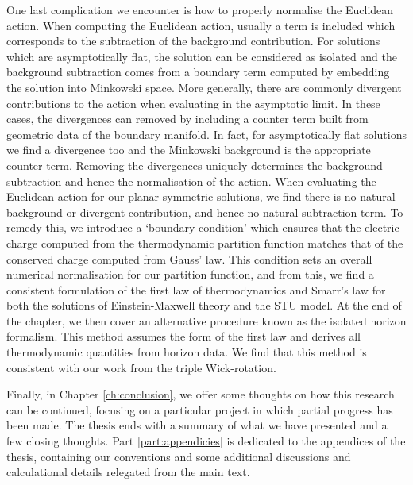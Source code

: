 One last complication we encounter is how to properly normalise the Euclidean action. When computing the Euclidean action, usually a term is included which corresponds to the subtraction of the background contribution. For solutions which are asymptotically flat, the solution can be considered as isolated and the background subtraction comes from a boundary term computed by embedding the solution into Minkowski space. More generally, there are commonly divergent contributions to the action when evaluating in the asymptotic limit. In these cases, the divergences can removed by including a counter term built from geometric data of the boundary manifold. In fact, for asymptotically flat solutions we find a divergence too and the Minkowski background is the appropriate counter term. Removing the divergences uniquely determines the background subtraction and hence the normalisation of the action. When evaluating the Euclidean action for our planar symmetric solutions, we find there is no natural background or divergent contribution, and hence no natural subtraction term. To remedy this, we introduce a  `boundary condition' which ensures that the electric charge computed from the thermodynamic partition function matches that of the conserved charge computed from Gauss' law. This condition sets an overall numerical normalisation for our partition function, and from this, we find a consistent formulation of the first law of thermodynamics and Smarr's law for both the solutions of Einstein-Maxwell theory and the STU model. At the end of the chapter, we then cover an alternative procedure known as the isolated horizon formalism. This method assumes the form of the first law and derives all thermodynamic quantities from horizon data. We find that this method is consistent with our work from the triple Wick-rotation.

Finally, in Chapter \ref{ch:conclusion}, we offer some thoughts on how this research can be continued, focusing on a particular project in which partial progress has been made. The thesis ends with a summary of what we have presented and a few closing thoughts. Part \ref{part:appendicies} is dedicated to the appendices of the thesis, containing our conventions and some additional discussions and calculational details relegated from the main text.